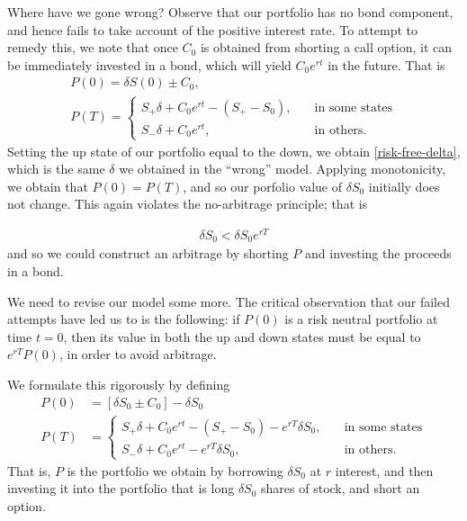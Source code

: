 \documentclass[12pt]{article}
\theoremstyle{plain}
\theoremstyle{definition}
\theoremstyle{remark}
\numberwithin{equation}{section}  %
\begin{document}
	Where have we gone wrong? Observe that our portfolio has no bond component,
	and hence fails to take account of the positive interest rate. To attempt to remedy this, we note that  once $C_{0}$ is obtained from shorting a call option, it can be
	immediately invested in a bond, which will yield $C_{0}e^{rt}$ in the future.
	That is
	\begin{gather*}
		P(0)  = \delta S(0) \pm C_{0},
		\\
		P(T)  = \begin{cases}
			S_{+} \delta + C_{0}e^{rt} - (S_{+} - S_{0}), \quad & \text{in some states}
			\\
			S_{-} \delta + C_{0}e^{rt}, \quad & \text{in others}.
		\end{cases}
	\end{gather*}
Setting the up state of our portfolio equal to the down, we obtain
\eqref{risk-free-delta},
which is the same $\delta$ we obtained in the ``wrong'' model. 
Applying monotonicity, we obtain that $P(0) = P(T)$, and so our porfolio value
of $\delta S_{0}$ initially does not change. This again violates the
no-arbitrage principle; that is

\begin{equation*}
\begin{split}
	\delta S_{0} < \delta S_{0} e^{rT}
\end{split}
\end{equation*}
and so we could construct an arbitrage by shorting $P$ and investing
the proceeds in a bond.

We need to revise our model some more. The critical observation that our failed
attempts have led us to is the following: if $P(0)$
is a risk neutral portfolio at time $t=0$, then its value in both the up and down
states must be equal to $e^{rT}P(0)$, in order to avoid arbitrage. 

We formulate this rigorously by defining
\begin{align*}
	P(0) & = [\delta S_{0} \pm C_{0}] - \delta S_{0}
	\\
		P(T)  & = \begin{cases}
			S_{+} \delta + C_{0}e^{rt} - (S_{+} - S_{0}) - e^{rT} \delta S_{0}, \quad & \text{in some states}
			\\
			S_{-} \delta + C_{0}e^{rt} - e^{rT} \delta S_{0}, \quad & \text{in others}.
		\end{cases}
\end{align*}
That is, $P$ is the portfolio we obtain by borrowing $\delta S_{0}$
at $r$ interest, and then investing it into the portfolio that is long
$\delta S_{0}$ shares of stock, and short an option.
\end{document}
